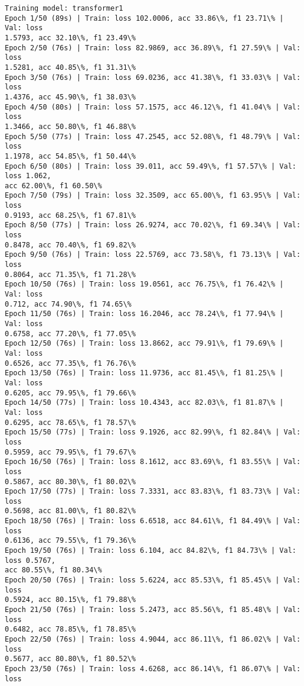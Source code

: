 \documentclass[8pt]{extarticle}
\begin{document}
    \begin{Verbatim}[commandchars=\\\{\}]
Training model: transformer1
Epoch 1/50 (89s) | Train: loss 102.0006, acc 33.86\%, f1 23.71\% | Val: loss
1.5793, acc 32.10\%, f1 23.49\%
Epoch 2/50 (76s) | Train: loss 82.9869, acc 36.89\%, f1 27.59\% | Val: loss
1.5281, acc 40.85\%, f1 31.31\%
Epoch 3/50 (76s) | Train: loss 69.0236, acc 41.38\%, f1 33.03\% | Val: loss
1.4376, acc 45.90\%, f1 38.03\%
Epoch 4/50 (80s) | Train: loss 57.1575, acc 46.12\%, f1 41.04\% | Val: loss
1.3466, acc 50.80\%, f1 46.88\%
Epoch 5/50 (77s) | Train: loss 47.2545, acc 52.08\%, f1 48.79\% | Val: loss
1.1978, acc 54.85\%, f1 50.44\%
Epoch 6/50 (80s) | Train: loss 39.011, acc 59.49\%, f1 57.57\% | Val: loss 1.062,
acc 62.00\%, f1 60.50\%
Epoch 7/50 (79s) | Train: loss 32.3509, acc 65.00\%, f1 63.95\% | Val: loss
0.9193, acc 68.25\%, f1 67.81\%
Epoch 8/50 (77s) | Train: loss 26.9274, acc 70.02\%, f1 69.34\% | Val: loss
0.8478, acc 70.40\%, f1 69.82\%
Epoch 9/50 (76s) | Train: loss 22.5769, acc 73.58\%, f1 73.13\% | Val: loss
0.8064, acc 71.35\%, f1 71.28\%
Epoch 10/50 (76s) | Train: loss 19.0561, acc 76.75\%, f1 76.42\% | Val: loss
0.712, acc 74.90\%, f1 74.65\%
Epoch 11/50 (76s) | Train: loss 16.2046, acc 78.24\%, f1 77.94\% | Val: loss
0.6758, acc 77.20\%, f1 77.05\%
Epoch 12/50 (76s) | Train: loss 13.8662, acc 79.91\%, f1 79.69\% | Val: loss
0.6526, acc 77.35\%, f1 76.76\%
Epoch 13/50 (76s) | Train: loss 11.9736, acc 81.45\%, f1 81.25\% | Val: loss
0.6205, acc 79.95\%, f1 79.66\%
Epoch 14/50 (77s) | Train: loss 10.4343, acc 82.03\%, f1 81.87\% | Val: loss
0.6295, acc 78.65\%, f1 78.57\%
Epoch 15/50 (77s) | Train: loss 9.1926, acc 82.99\%, f1 82.84\% | Val: loss
0.5959, acc 79.95\%, f1 79.67\%
Epoch 16/50 (76s) | Train: loss 8.1612, acc 83.69\%, f1 83.55\% | Val: loss
0.5867, acc 80.30\%, f1 80.02\%
Epoch 17/50 (77s) | Train: loss 7.3331, acc 83.83\%, f1 83.73\% | Val: loss
0.5698, acc 81.00\%, f1 80.82\%
Epoch 18/50 (76s) | Train: loss 6.6518, acc 84.61\%, f1 84.49\% | Val: loss
0.6136, acc 79.55\%, f1 79.36\%
Epoch 19/50 (76s) | Train: loss 6.104, acc 84.82\%, f1 84.73\% | Val: loss 0.5767,
acc 80.55\%, f1 80.34\%
Epoch 20/50 (76s) | Train: loss 5.6224, acc 85.53\%, f1 85.45\% | Val: loss
0.5924, acc 80.15\%, f1 79.88\%
Epoch 21/50 (76s) | Train: loss 5.2473, acc 85.56\%, f1 85.48\% | Val: loss
0.6482, acc 78.85\%, f1 78.85\%
Epoch 22/50 (76s) | Train: loss 4.9044, acc 86.11\%, f1 86.02\% | Val: loss
0.5677, acc 80.80\%, f1 80.52\%
Epoch 23/50 (76s) | Train: loss 4.6268, acc 86.14\%, f1 86.07\% | Val: loss

\end{Verbatim}
\end{document}
